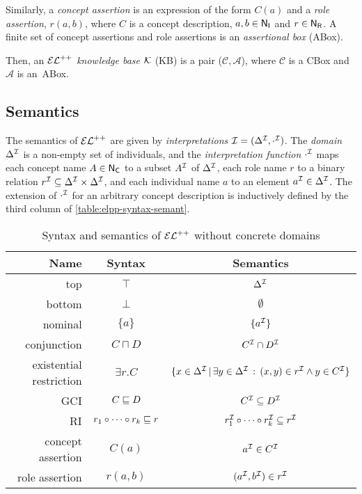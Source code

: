 Similarly, a \emph{concept assertion} is an expression of the form $C(a)$ and a \emph{role assertion}, $r(a, b)$, where $C$ is a concept description, $a, b \in \mathsf{N_I}$ and $r \in \mathsf{N_R}$. A finite set of concept assertions and role assertions is an \emph{assertional box} (ABox).

Then, an $\mathcal{EL}^{++}$ \emph{knowledge base} $\mathcal{K}$ (KB) is a pair ($\mathcal{C}, \mathcal{A}$), where $\mathcal{C}$ is a CBox and $\mathcal{A}$ is an~ABox.

\subsection{Semantics}
The semantics of $\mathcal{EL}^{++}$ are given by \emph{interpretations} $\mathcal{I} = (\Delta^{\mathcal{I}}, \cdot^{\mathcal{I}})$. The \emph{domain} $\Delta^{\mathcal{I}}$ is a non-empty set of individuals, and the \emph{interpretation function} $\cdot^{\mathcal{I}}$ maps each concept name $A \in \mathsf{N_C}$ to a subset $A^{\mathcal{I}}$ of $\Delta^{\mathcal{I}}$, each role name $r$ to a binary relation $r^{\mathcal{I}} \subseteq \Delta^{\mathcal{I}} \times \Delta^{\mathcal{I}}$, and each individual name $a$ to an element $a^{\mathcal{I}} \in \Delta^{\mathcal{I}}$. The extension of $\cdot^{\mathcal{I}}$ for an arbitrary concept description is inductively defined by the third column of \autoref{table:elpp-syntax-semant}.

\begin{table}
  \centering
  \begin{tabular}{@{}rcc@{}}
    \toprule
    Name & Syntax & Semantics \\
    \midrule
    top     & $\top$  & $\Delta^{\mathcal{I}}$ \\
    bottom  & $\bot$  & $\emptyset$ \\
    nominal & $\{a\}$ & $\{a^{\mathcal{I}}\}$ \\
    conjunction & $C \sqcap D$ & $C^{\mathcal{I}} \cap D^{\mathcal{I}}$ \\
    existential restriction & $\exists r.C$ & $\{ x \in \Delta^{\mathcal{I}} \, | \, \exists y \in \Delta^{\mathcal{I}} \, : \, (x, y) \in r^{\mathcal{I}} \land y \in C^{\mathcal{I}} \}$ \\
    GCI & $C \sqsubseteq D$ & $C^{\mathcal{I}} \subseteq D^{\mathcal{I}}$ \\
    RI  & $r_1 \circ \cdots \circ r_k \sqsubseteq r$ & $r_1^{\mathcal{I}} \circ \cdots \circ r_k^{\mathcal{I}} \subseteq r^{\mathcal{I}}$ \\
    concept assertion & $C(a)$ & $a^{\mathcal{I}} \in C^{\mathcal{I}}$ \\
    role assertion & $r(a, b)$ & $(a^{\mathcal{I}}, b^{\mathcal{I}}) \in r^{\mathcal{I}}$\\ 
    \bottomrule
  \end{tabular}
  \caption{Syntax and semantics of $\mathcal{EL}^{++}$ without concrete domains}
  \label{table:elpp-syntax-semant}
\end{table}

